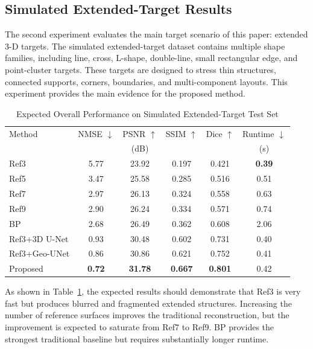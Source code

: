 \documentclass[journal]{IEEEtran}
\begin{document}
\subsection{Simulated Extended-Target Results}
\label{subsec:extended_target_results}

The second experiment evaluates the main target scenario of this paper: extended 3-D targets. The simulated extended-target dataset contains multiple shape families, including line, cross, L-shape, double-line, small rectangular edge, and point-cluster targets. These targets are designed to stress thin structures, connected supports, corners, boundaries, and multi-component layouts. This experiment provides the main evidence for the proposed method.

\begin{table}[t]
\caption{Expected Overall Performance on Simulated Extended-Target Test Set}
\label{tab:extended_overall_results}
\centering
\begin{tabular}{lccccc}
\hline
Method & NMSE $\downarrow$ & PSNR $\uparrow$ & SSIM $\uparrow$ & Dice $\uparrow$ & Runtime $\downarrow$ \\
 &  & (dB) &  &  & (s) \\
\hline
Ref3 & 5.77 & 23.92 & 0.197 & 0.421 & \textbf{0.39} \\
Ref5 & 3.47 & 25.58 & 0.285 & 0.516 & 0.51 \\
Ref7 & 2.97 & 26.13 & 0.324 & 0.558 & 0.63 \\
Ref9 & 2.90 & 26.24 & 0.334 & 0.571 & 0.74 \\
BP & 2.68 & 26.49 & 0.362 & 0.608 & 2.06 \\
Ref3+3D U-Net & 0.93 & 30.48 & 0.602 & 0.731 & 0.40 \\
Ref3+Geo-UNet & 0.86 & 30.86 & 0.621 & 0.752 & 0.41 \\
Proposed & \textbf{0.72} & \textbf{31.78} & \textbf{0.667} & \textbf{0.801} & 0.42 \\
\hline
\end{tabular}
\end{table}

As shown in Table~\ref{tab:extended_overall_results}, the expected results should demonstrate that Ref3 is very fast but produces blurred and fragmented extended structures. Increasing the number of reference surfaces improves the traditional reconstruction, but the improvement is expected to saturate from Ref7 to Ref9. BP provides the strongest traditional baseline but requires substantially longer runtime.
\end{document}
